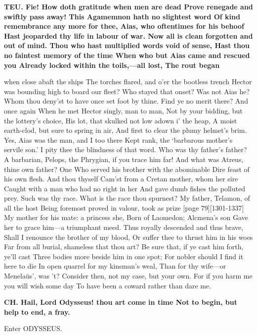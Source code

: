 \documentclass[11pt,letter]{book}
\begin{document}
\par \textbf{TEU. Fie! How doth gratitude when men are dead Prove renegade and swiftly pass away! This Agamemnon hath no slightest word Of kind remembrance any more for thee, Aias, who oftentimes for his behoof Hast jeoparded thy life in labour of war. Now all is clean forgotten and out of mind. Thou who hast multiplied words void of sense, Hast thou no faintest memory of the time When who but Aias came and rescued you Already locked within the toils,—all lost, The rout began}
\par   when close abaft the ships The torches flared, and o’er the bootless trench Hector was bounding high to board our fleet? Who stayed that onset? Was not Aias he? Whom thou deny’st to have once set foot by thine. Find ye no merit there? And once again When he met Hector singly, man to man, Not by your bidding, but the lottery’s choice, His lot, that skulked not low adown i’ the heap, A moist earth-clod, but sure to spring in air, And first to clear the plumy helmet’s brim. Yes, Aias was the man, and I too there Kept rank, the ‘barbarous mother’s servile son.’ I pity thee the blindness of that word. Who was thy father’s father? A barbarian, Pelops, the Phrygian, if you trace him far! And what was Atreus, thine own father? One Who served his brother with the abominable Dire feast of his own flesh. And thou thyself Cam’st from a Cretan mother, whom her sire Caught with a man who had no right in her And gave dumb fishes the polluted prey. Such was thy race. What is the race thou spurnest? My father, Telamon, of all the host Being foremost proved in valour, took as prize [page 79][1301-1337] My mother for his mate:  a princess she, Born of Laomedon; Alcmena’s son Gave her to grace him—a triumphant meed. Thus royally descended and thus brave, Shall I renounce the brother of my blood, Or suffer thee to thrust him in his woes Far from all burial, shameless that thou art? Be sure that, if ye cast him forth, ye’ll cast Three bodies more beside him in one spot; For nobler should I find it here to die In open quarrel for my kinsman’s weal, Than for thy wife—or Menelaüs’, was ’t? Consider then, not my case, but your own. For if you harm me you will wish some day To have been a coward rather than dare me.

\par \textbf{CH. Hail, Lord Odysseus! thou art come in time Not to begin, but help to end, a fray.}
\par 

\par  Enter ODYSSEUS.
\end{document}

